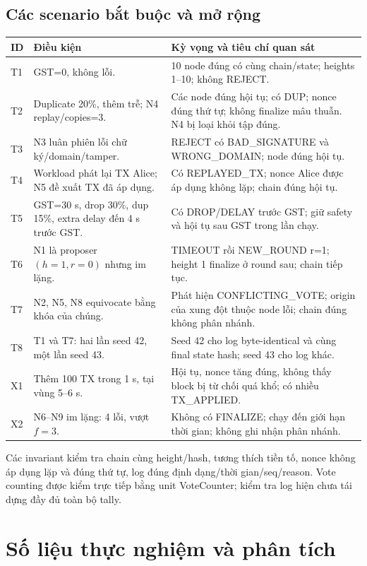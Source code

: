 \documentclass[11pt,a4paper]{article}
\newcommand{\note}[1]{\par\smallskip\noindent\colorbox{pale}{\parbox{\dimexpr\linewidth-2\fboxsep\relax}{\small #1}}\par\smallskip}
\newcommand{\nextpage}{\clearpage}
\begin{document}
\subsection{Các scenario bắt buộc và mở rộng}
{\small\begin{tabularx}{\linewidth}{P{9mm}P{47mm}Y}
\toprule\textbf{ID} & \textbf{Điều kiện} & \textbf{Kỳ vọng và tiêu chí quan sát}\\\midrule
T1 & GST=0, không lỗi. & 10 node đúng có cùng chain/state; heights 1--10; không REJECT.\\
T2 & Duplicate 20\%, thêm trễ; N4 replay/copies=3. & Các node đúng hội tụ; có DUP; nonce đúng thứ tự; không finalize mâu thuẫn. N4 bị loại khỏi tập đúng.\\
T3 & N3 luân phiên lỗi chữ ký/domain/tamper. & REJECT có BAD\_SIGNATURE và WRONG\_DOMAIN; node đúng hội tụ.\\
T4 & Workload phát lại TX Alice; N5 đề xuất TX đã áp dụng. & Có REPLAYED\_TX; nonce Alice được áp dụng không lặp; chain đúng hội tụ.\\
T5 & GST=30 s, drop 30\%, dup 15\%, extra delay đến 4 s trước GST. & Có DROP/DELAY trước GST; giữ safety và hội tụ sau GST trong lần chạy.\\
T6 & N1 là proposer $(h=1,r=0)$ nhưng im lặng. & TIMEOUT rồi NEW\_ROUND r=1; height 1 finalize ở round sau; chain tiếp tục.\\
T7 & N2, N5, N8 equivocate bằng khóa của chúng. & Phát hiện CONFLICTING\_VOTE; origin của xung đột thuộc node lỗi; chain đúng không phân nhánh.\\
T8 & T1 và T7: hai lần seed 42, một lần seed 43. & Seed 42 cho log byte-identical và cùng final state hash; seed 43 cho log khác.\\
X1 & Thêm 100 TX trong 1 s, tại vùng 5--6 s. & Hội tụ, nonce tăng đúng, không thấy block bị từ chối quá khổ; có nhiều TX\_APPLIED.\\
X2 & N6--N9 im lặng: 4 lỗi, vượt $f=3$. & Không có FINALIZE; chạy đến giới hạn thời gian; không ghi nhận phân nhánh.\\
\bottomrule\end{tabularx}}

\note{Các invariant kiểm tra chain cùng height/hash, tương thích tiền tố, nonce không áp dụng lặp và đúng thứ tự, log đúng định dạng/thời gian/seq/reason. Vote counting được kiểm trực tiếp bằng unit VoteCounter; kiểm tra log hiện chưa tái dựng đầy đủ toàn bộ tally.}

\nextpage
\section{Số liệu thực nghiệm và phân tích}

\end{document}

